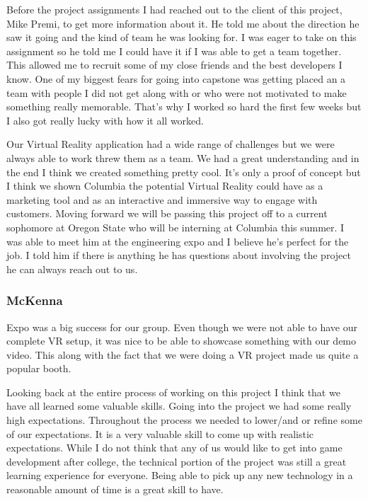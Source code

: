\documentclass[10pt,journal,compsoc,onecolumn, draftclsnofoot]{IEEEtran}
\begin{document}
Before the project assignments I had reached out to the client of this project, Mike Premi, to get more information about it. He told me about the direction he saw it going and the kind of team he was looking for. I was eager to take on this assignment so he told me I could have it if I was able to get a team together. This allowed me to recruit some of my close friends and the best developers I know. One of my biggest fears for going into capstone was getting placed an a team with people I did not get along with or who were not motivated to make something really memorable. That's why I worked so hard the first few weeks but I also got really lucky with how it all worked.

Our Virtual Reality application had a wide range of challenges but we were always able to work threw them as a team. We had a great understanding and in the end I think we created something pretty cool. It's only a proof of concept but I think we shown Columbia the potential Virtual Reality could have as a marketing tool and as an interactive and immersive way to engage with customers. Moving forward we will be passing this project off to a current sophomore at Oregon State who will be interning at Columbia this summer. I was able to meet him at the engineering expo and I believe he's perfect for the job. I told him if there is anything he has questions about involving the project he can always reach out to us.

\subsubsection{McKenna}

Expo was a big success for our group. Even though we were not able to have our complete VR setup, it was nice to be able to showcase something with our demo video. This along with the fact that we were doing a VR project made us quite a popular booth.

Looking back at the entire process of working on this project I think that we have all learned some valuable skills. Going into the project we had some really high expectations. Throughout the process we needed to lower/and or refine some of our expectations. It is a very valuable skill to come up with realistic expectations. While I do not think that any of us would like to get into game development after college, the technical portion of the project was still a great learning experience for everyone. Being able to pick up any new technology in a reasonable amount of time is a great skill to have.
\end{document}
